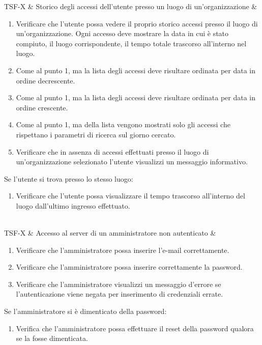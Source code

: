TSF-X & Storico degli accessi dell'utente presso un luogo di un'organizzazione & \begin{enumerate}
    \item Verificare che l'utente possa vedere il proprio storico accessi presso il luogo di un'organizzazione. Ogni accesso deve mostrare la data in cui è stato compiuto, il luogo corrispondente, il tempo totale trascorso all'interno nel luogo.
    \item Come al punto 1, ma la lista degli accessi deve risultare ordinata per data in ordine decrescente.
    \item Come al punto 1, ma la lista degli accessi deve risultare ordinata per data in ordine crescente.
    \item Come al punto 1, ma della lista vengono mostrati solo gli accessi che rispettano i parametri di ricerca sul giorno cercato.
    \item Verificare che in assenza di accessi effettuati presso il luogo di un'organizzazione selezionato l'utente visualizzi un messaggio informativo.
\end{enumerate}
Se l'utente si trova presso lo stesso luogo:
\begin{enumerate}
    \item Verificare che l'utente possa visualizzare il tempo trascorso all'interno del luogo dall'ultimo ingresso effettuato.
\end{enumerate} \\

TSF-X & Accesso al server di un amministratore non autenticato & \begin{enumerate}
    \item Verificare che l'amministratore possa inserire l'e-mail correttamente.
    \item Verificare che l'amministratore possa inserire correttamente la password.
    \item Verificare che l'amministratore visualizzi un messaggio d'errore se l'autenticazione viene negata per inserimento di credenziali errate.
\end{enumerate}
Se l'amministratore si è dimenticato della password:
\begin{enumerate}
    \item Verifica che l'amministratore possa effettuare il reset della password qualora se la fosse dimenticata.
\end{enumerate} \\

